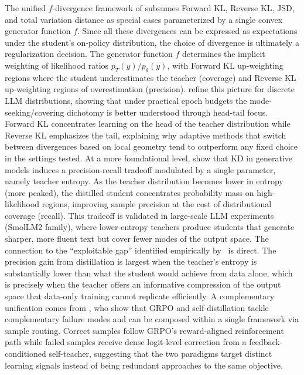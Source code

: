 \documentclass{article} %
\newcommand{\ptheta}{p_\theta}
\newcommand{\pteacher}{p_T}
\begin{document}
The unified $f$-divergence framework of \citet{2307.15190} subsumes Forward KL, Reverse KL, JSD, and total variation distance as special cases parameterized by a single convex generator function $f$. Since all these divergences can be expressed as expectations under the student's on-policy distribution, the choice of divergence is ultimately a regularization decision. The generator function $f$ determines the implicit weighting of likelihood ratios $\pteacher(y)/\ptheta(y)$, with Forward KL up-weighting regions where the student underestimates the teacher (coverage) and Reverse KL up-weighting regions of overestimation (precision). \citet{2404.02657} refine this picture for discrete LLM distributions, showing that under practical epoch budgets the mode-seeking/covering dichotomy is better understood through head-tail focus. Forward KL concentrates learning on the head of the teacher distribution while Reverse KL emphasizes the tail, explaining why adaptive methods that switch between divergences based on local geometry tend to outperform any fixed choice in the settings tested. At a more foundational level, \citet{2505.13111} show that KD in generative models induces a precision-recall tradeoff modulated by a single parameter, namely teacher entropy. As the teacher distribution becomes lower in entropy (more peaked), the distilled student concentrates probability mass on high-likelihood regions, improving sample precision at the cost of distributional coverage (recall). This tradeoff is validated in large-scale LLM experiments (SmolLM2 family), where lower-entropy teachers produce students that generate sharper, more fluent text but cover fewer modes of the output space. The connection to the ``exploitable gap'' identified empirically by~\citet{2604.13016} is direct. The precision gain from distillation is largest when the teacher's entropy is substantially lower than what the student would achieve from data alone, which is precisely when the teacher offers an informative compression of the output space that data-only training cannot replicate efficiently. A complementary unification comes from \citet{2604.02288}, who show that GRPO and self-distillation tackle complementary failure modes and can be composed within a single framework via sample routing. Correct samples follow GRPO's reward-aligned reinforcement path while failed samples receive dense logit-level correction from a feedback-conditioned self-teacher, suggesting that the two paradigms target distinct learning signals instead of being redundant approaches to the same objective.
\end{document}
